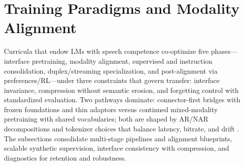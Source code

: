 \documentclass{article}
\begin{document}
\section{Training Paradigms and Modality Alignment} \label{sec:Training Paradigms and Modality Alignment}
Curricula that endow LMs with speech competence co-optimize five phases---interface pretraining, modality alignment, supervised and instruction consolidation, duplex/streaming specialization, and post-alignment via preferences/RL---under three constraints that govern transfer: interface invariance, compression without semantic erosion, and forgetting control with standardized evaluation. Two pathways dominate: connector-first bridges with frozen foundations and thin adaptors versus continued mixed-modality pretraining with shared vocabularies; both are shaped by AR/NAR decompositions and tokenizer choices that balance latency, bitrate, and drift \cite{turetzky2024lastlanguagemodelawarespeechtokenization,wang2023slmbridgethingapbetweenspeechtextfoundat,zeng2024scalingspeechtextpretrainingsyntheticint}. The subsections consolidate multi-stage pipelines and alignment blueprints, scalable synthetic supervision, interface consistency with compression, and diagnostics for retention and robustness.
\end{document}
